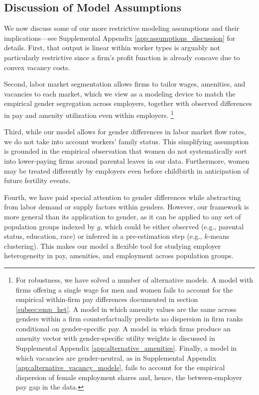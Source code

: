 \subsection{Discussion of Model Assumptions\label{subsec:discussion_model_assumptions}}

We now discuss some of our more restrictive modeling assumptions and their implications---see Supplemental Appendix \ref{app:assumptions_discussion} for details. %
%
First, that output is linear within worker types is arguably not particularly restrictive since a firm's profit function is already concave due to convex vacancy costs.

Second, labor market segmentation allows firms to tailor wages, amenities, and vacancies to each market, which we view as a modeling device to match the empirical gender segregation across employers, together with observed differences in pay and amenity utilization even within employers.%
%
\footnote{For robustness, we have solved a number of alternative models. A model with firms offering a single wage for men and women fails to account for the empirical within-firm pay differences documented in section \ref{subsec:emp_het}. A model in which amenity values are the same across genders within a firm counterfactually predicts no dispersion in firm ranks conditional on gender-specific pay. A model in which firms produce an amenity vector with gender-specific utility weights is discussed in Supplemental Appendix \ref{app:alternative_amenities}. Finally, a model in which vacancies are gender-neutral, as in Supplemental Appendix \ref{app:alternative_vacancy_models}, fails to account for the empirical dispersion of female employment shares and, hence, the between-employer pay gap in the data.}

Third, while our model allows for gender differences in labor market flow rates, we do not take into account workers' family status. This simplifying assumption is grounded in the empirical observation that women do not systematically sort into lower-paying firms around parental leaves in our data. Furthermore, women may be treated differently by employers even before childbirth in anticipation of future fertility events.

Fourth, we have paid special attention to gender differences while abstracting from labor demand or supply factors within genders. However, our framework is more general than its application to gender, as it can be applied to any set of population groups indexed by $g$, which could be either observed (e.g., parental status, education, race) or inferred in a pre-estimation step (e.g., $k$-means clustering). This makes our model a flexible tool for studying employer heterogeneity in pay, amenities, and employment across population groups.

